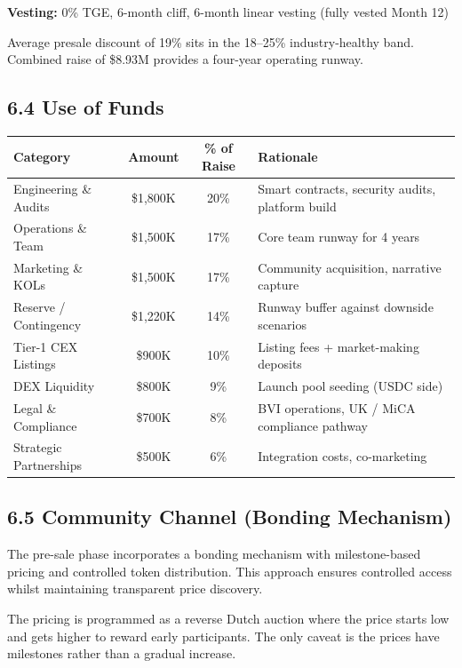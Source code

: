 \documentclass[
  paper=a4,
  ,captions=tableheading
]{scrartcl}
\begin{document}
\textbf{Vesting:} 0\% TGE, 6-month cliff, 6-month linear vesting (fully vested Month 12)

Average presale discount of 19\% sits in the 18--25\% industry-healthy band. Combined raise of \$8.93M provides a four-year operating runway.

\subsection{6.4 Use of Funds}\label{use-of-funds}

\begin{center}
\begin{tabular}{lccl}
\toprule
\textbf{Category} & \textbf{Amount} & \textbf{\% of Raise} & \textbf{Rationale} \\
\midrule
Engineering \& Audits & \$1,800K & 20\% & Smart contracts, security audits, platform build \\
Operations \& Team & \$1,500K & 17\% & Core team runway for 4 years \\
Marketing \& KOLs & \$1,500K & 17\% & Community acquisition, narrative capture \\
Reserve / Contingency & \$1,220K & 14\% & Runway buffer against downside scenarios \\
Tier-1 CEX Listings & \$900K & 10\% & Listing fees + market-making deposits \\
DEX Liquidity & \$800K & 9\% & Launch pool seeding (USDC side) \\
Legal \& Compliance & \$700K & 8\% & BVI operations, UK / MiCA compliance pathway \\
Strategic Partnerships & \$500K & 6\% & Integration costs, co-marketing \\
\bottomrule
\end{tabular}
\end{center}

\subsection{6.5 Community Channel (Bonding Mechanism)}\label{community-channel-bonding-mechanism}

The pre-sale phase incorporates a bonding mechanism with milestone-based pricing and controlled token distribution. This approach ensures controlled access whilst maintaining transparent price discovery.

The pricing is programmed as a reverse Dutch auction where the price starts low and gets higher to reward early participants. The only caveat is the prices have milestones rather than a gradual increase.
\end{document}
